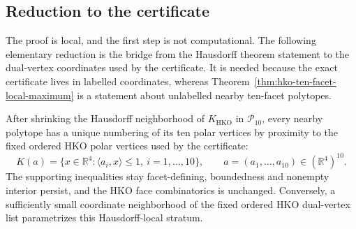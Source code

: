 \clearpage
\subsection{Reduction to the certificate}
\label{subsec:hko-local-maximum-decision-problem}

The proof is local, and the first step is not computational. The following
elementary reduction is the bridge from the Hausdorff theorem statement to the
dual-vertex coordinates used by the certificate. It is needed because the
exact certificate lives in labelled coordinates, whereas
Theorem~\ref{thm:hko-ten-facet-local-maximum} is a statement about unlabelled
nearby ten-facet polytopes.

\begin{lemma}
\label{lem:hko-hausdorff-local-ten-facet-chart}
After shrinking the Hausdorff neighborhood of \(K_{\mathrm{HKO}}\) in
\(\mathcal P_{10}\), every nearby polytope has a unique numbering of its ten
polar vertices by proximity to the fixed ordered HKO polar vertices used by the
certificate:
\[
  K(a)=
  \{x\in\mathbb R^4:\langle a_i,x\rangle\le 1,\ i=1,\ldots,10\},
  \qquad
  a=(a_1,\ldots,a_{10})\in(\mathbb R^4)^{10}.
\]
The supporting inequalities stay facet-defining, boundedness and nonempty
interior persist, and the HKO face combinatorics is unchanged. Conversely, a
sufficiently small coordinate neighborhood of the fixed ordered HKO dual-vertex
list parametrizes this Hausdorff-local stratum.
\end{lemma}

